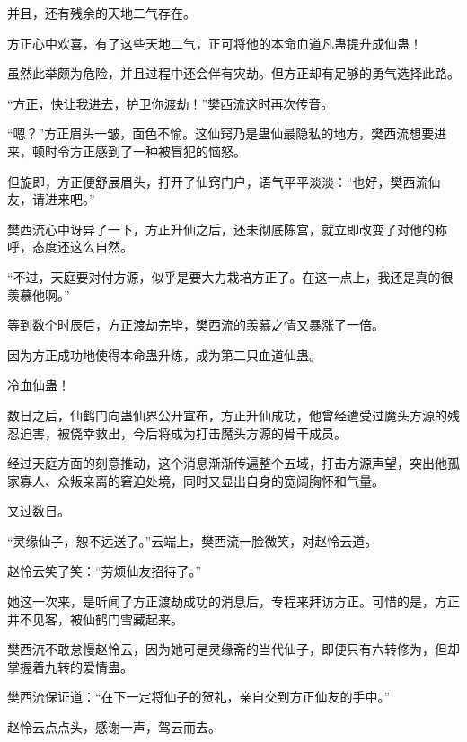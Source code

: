 \begin{this_body}
并且，还有残余的天地二气存在。

方正心中欢喜，有了这些天地二气，正可将他的本命血道凡蛊提升成仙蛊！

虽然此举颇为危险，并且过程中还会伴有灾劫。但方正却有足够的勇气选择此路。

“方正，快让我进去，护卫你渡劫！”樊西流这时再次传音。

“嗯？”方正眉头一皱，面色不愉。这仙窍乃是蛊仙最隐私的地方，樊西流想要进来，顿时令方正感到了一种被冒犯的恼怒。

但旋即，方正便舒展眉头，打开了仙窍门户，语气平平淡淡：“也好，樊西流仙友，请进来吧。”

樊西流心中讶异了一下，方正升仙之后，还未彻底陈宫，就立即改变了对他的称呼，态度还这么自然。

“不过，天庭要对付方源，似乎是要大力栽培方正了。在这一点上，我还是真的很羡慕他啊。”

等到数个时辰后，方正渡劫完毕，樊西流的羡慕之情又暴涨了一倍。

因为方正成功地使得本命蛊升炼，成为第二只血道仙蛊。

冷血仙蛊！

数日之后，仙鹤门向蛊仙界公开宣布，方正升仙成功，他曾经遭受过魔头方源的残忍迫害，被侥幸救出，今后将成为打击魔头方源的骨干成员。

经过天庭方面的刻意推动，这个消息渐渐传遍整个五域，打击方源声望，突出他孤家寡人、众叛亲离的窘迫处境，同时又显出自身的宽阔胸怀和气量。

又过数日。

“灵缘仙子，恕不远送了。”云端上，樊西流一脸微笑，对赵怜云道。

赵怜云笑了笑：“劳烦仙友招待了。”

她这一次来，是听闻了方正渡劫成功的消息后，专程来拜访方正。可惜的是，方正并不见客，被仙鹤门雪藏起来。

樊西流不敢怠慢赵怜云，因为她可是灵缘斋的当代仙子，即便只有六转修为，但却掌握着九转的爱情蛊。

樊西流保证道：“在下一定将仙子的贺礼，亲自交到方正仙友的手中。”

赵怜云点点头，感谢一声，驾云而去。

\end{this_body}

